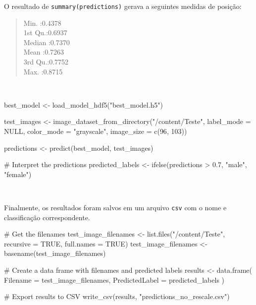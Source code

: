 \documentclass[
  a4paperpaper,
]{article}
\newenvironment{Shaded}{\begin{snugshade}}{\end{snugshade}}
\newcommand{\AttributeTok}[1]{\textcolor[rgb]{0.40,0.45,0.13}{#1}}
\newcommand{\CommentTok}[1]{\textcolor[rgb]{0.37,0.37,0.37}{#1}}
\newcommand{\ConstantTok}[1]{\textcolor[rgb]{0.56,0.35,0.01}{#1}}
\newcommand{\DecValTok}[1]{\textcolor[rgb]{0.68,0.00,0.00}{#1}}
\newcommand{\FloatTok}[1]{\textcolor[rgb]{0.68,0.00,0.00}{#1}}
\newcommand{\FunctionTok}[1]{\textcolor[rgb]{0.28,0.35,0.67}{#1}}
\newcommand{\NormalTok}[1]{\textcolor[rgb]{0.00,0.23,0.31}{#1}}
\newcommand{\OtherTok}[1]{\textcolor[rgb]{0.00,0.23,0.31}{#1}}
\newcommand{\SpecialCharTok}[1]{\textcolor[rgb]{0.37,0.37,0.37}{#1}}
\newcommand{\StringTok}[1]{\textcolor[rgb]{0.13,0.47,0.30}{#1}}
\begin{document}
O resultado de \texttt{summary(predictions)} gerava a seguintes medidas
de posição:

\begin{quote}
Min. :0.4378\\
1st Qu.:0.6937\\
Median :0.7370\\
Mean :0.7263\\
3rd Qu.:0.7752\\
Max. :0.8715
\end{quote}

~

\begin{Shaded}
\begin{Highlighting}[]
\NormalTok{best\_model }\OtherTok{\textless{}{-}} \FunctionTok{load\_model\_hdf5}\NormalTok{(}\StringTok{"best\_model.h5"}\NormalTok{)}

\NormalTok{test\_images }\OtherTok{\textless{}{-}} \FunctionTok{image\_dataset\_from\_directory}\NormalTok{(}\StringTok{"/content/Teste"}\NormalTok{,}
                                            \AttributeTok{label\_mode =} \ConstantTok{NULL}\NormalTok{,}
                                            \AttributeTok{color\_mode =} \StringTok{"grayscale"}\NormalTok{,}
                                            \AttributeTok{image\_size =} \FunctionTok{c}\NormalTok{(}\DecValTok{96}\NormalTok{, }\DecValTok{103}\NormalTok{))}

\NormalTok{predictions }\OtherTok{\textless{}{-}} \FunctionTok{predict}\NormalTok{(best\_model, test\_images)}

\CommentTok{\# Interpret the predictions}
\NormalTok{predicted\_labels }\OtherTok{\textless{}{-}} \FunctionTok{ifelse}\NormalTok{(predictions }\SpecialCharTok{\textgreater{}} \FloatTok{0.7}\NormalTok{, }\StringTok{"male"}\NormalTok{, }\StringTok{"female"}\NormalTok{)}
\end{Highlighting}
\end{Shaded}

~

Finalmente, os resultados foram salvos em um arquivo \texttt{csv} com o
nome e classificação correspondente.

\begin{Shaded}
\begin{Highlighting}[]
\CommentTok{\# Get the filenames}
\NormalTok{test\_image\_filenames }\OtherTok{\textless{}{-}} \FunctionTok{list.files}\NormalTok{(}\StringTok{"/content/Teste"}\NormalTok{, }\AttributeTok{recursive =} \ConstantTok{TRUE}\NormalTok{, }\AttributeTok{full.names =} \ConstantTok{TRUE}\NormalTok{)}
\NormalTok{test\_image\_filenames }\OtherTok{\textless{}{-}} \FunctionTok{basename}\NormalTok{(test\_image\_filenames)}

\CommentTok{\# Create a data frame with filenames and predicted labels}
\NormalTok{results }\OtherTok{\textless{}{-}} \FunctionTok{data.frame}\NormalTok{(}
  \AttributeTok{Filename =}\NormalTok{ test\_image\_filenames,}
  \AttributeTok{PredictedLabel =}\NormalTok{ predicted\_labels}
\NormalTok{)}

\CommentTok{\# Export results to CSV}
\FunctionTok{write\_csv}\NormalTok{(results, }\StringTok{"predictions\_no\_rescale.csv"}\NormalTok{)}
\end{Highlighting}
\end{Shaded}
\end{document}
